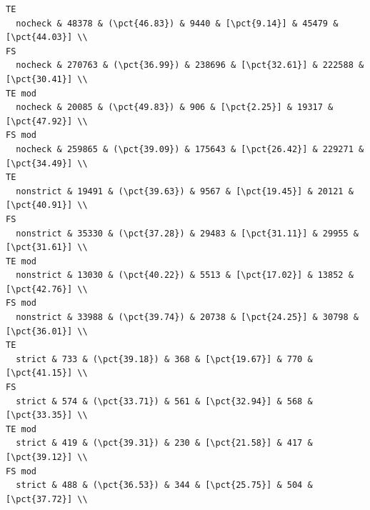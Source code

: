 \documentclass{article}
\begin{document}
\begin{verbatim}
TE
  nocheck & 48378 & (\pct{46.83}) & 9440 & [\pct{9.14}] & 45479 & [\pct{44.03}] \\
FS
  nocheck & 270763 & (\pct{36.99}) & 238696 & [\pct{32.61}] & 222588 & [\pct{30.41}] \\
TE mod
  nocheck & 20085 & (\pct{49.83}) & 906 & [\pct{2.25}] & 19317 & [\pct{47.92}] \\
FS mod
  nocheck & 259865 & (\pct{39.09}) & 175643 & [\pct{26.42}] & 229271 & [\pct{34.49}] \\
TE
  nonstrict & 19491 & (\pct{39.63}) & 9567 & [\pct{19.45}] & 20121 & [\pct{40.91}] \\
FS
  nonstrict & 35330 & (\pct{37.28}) & 29483 & [\pct{31.11}] & 29955 & [\pct{31.61}] \\
TE mod
  nonstrict & 13030 & (\pct{40.22}) & 5513 & [\pct{17.02}] & 13852 & [\pct{42.76}] \\
FS mod
  nonstrict & 33988 & (\pct{39.74}) & 20738 & [\pct{24.25}] & 30798 & [\pct{36.01}] \\
TE
  strict & 733 & (\pct{39.18}) & 368 & [\pct{19.67}] & 770 & [\pct{41.15}] \\
FS
  strict & 574 & (\pct{33.71}) & 561 & [\pct{32.94}] & 568 & [\pct{33.35}] \\
TE mod
  strict & 419 & (\pct{39.31}) & 230 & [\pct{21.58}] & 417 & [\pct{39.12}] \\
FS mod
  strict & 488 & (\pct{36.53}) & 344 & [\pct{25.75}] & 504 & [\pct{37.72}] \\
\end{verbatim}
\end{document}
